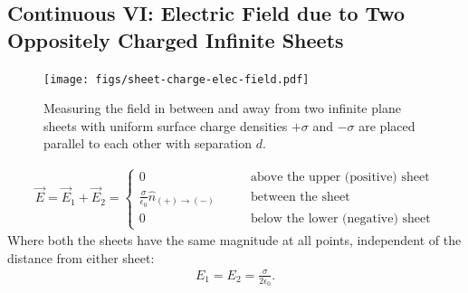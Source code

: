 \documentclass[12pt,b4paper]{article}
\begin{document}
\subsection{Continuous VI: Electric Field due to Two Oppositely Charged Infinite Sheets}
\begin{figure}[H]
    \centering
    \texttt{[image: figs/sheet-charge-elec-field.pdf]}    \caption{Measuring the field in between and away from two infinite plane sheets with uniform surface charge densities $+\sigma$ and $-\sigma$ are placed parallel to each other with separation $d$.}
    \label{fig:sheet-charge-elec-field}
\end{figure}
\begin{align}
    \vec{E}=\vec{E}_1+\vec{E}_2=\left\{
                \begin{array}{ll}
                  0&\qquad\text{above the upper (positive) sheet}\\[5pt]
                  \displaystyle \frac{\sigma}{\epsilon_0}\hat{n}_{(+)\to(-)}&\qquad\text{between the sheet}\\[8pt]
                  0&\qquad\text{below the lower (negative) sheet}
                \end{array}
              \right.
\end{align}
Where both the sheets have the same magnitude at all points, independent of the distance from either sheet: 
\begin{align*}
    E_1=E_2=\frac{\sigma}{2\epsilon_0}.
\end{align*}

\end{document}
